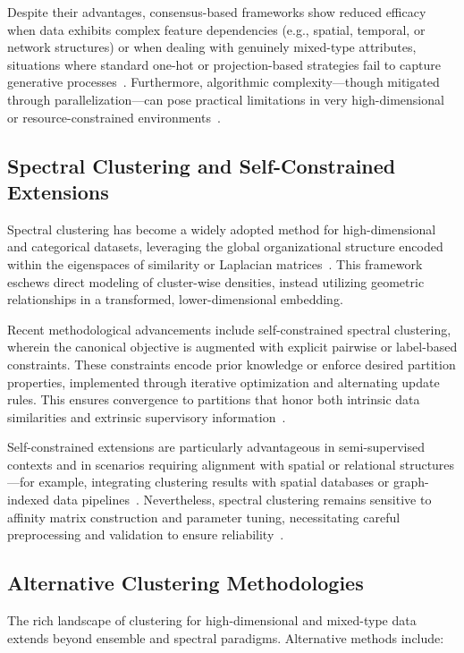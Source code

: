 Despite their advantages, consensus-based frameworks show reduced efficacy when data exhibits complex feature dependencies (e.g., spatial, temporal, or network structures) or when dealing with genuinely mixed-type attributes, situations where standard one-hot or projection-based strategies fail to capture generative processes~\cite{ref116}. Furthermore, algorithmic complexity—though mitigated through parallelization—can pose practical limitations in very high-dimensional or resource-constrained environments~\cite{ref116}.

\subsection{Spectral Clustering and Self-Constrained Extensions}

Spectral clustering has become a widely adopted method for high-dimensional and categorical datasets, leveraging the global organizational structure encoded within the eigenspaces of similarity or Laplacian matrices~\cite{ref36,ref117}. This framework eschews direct modeling of cluster-wise densities, instead utilizing geometric relationships in a transformed, lower-dimensional embedding.

Recent methodological advancements include self-constrained spectral clustering, wherein the canonical objective is augmented with explicit pairwise or label-based constraints. These constraints encode prior knowledge or enforce desired partition properties, implemented through iterative optimization and alternating update rules. This ensures convergence to partitions that honor both intrinsic data similarities and extrinsic supervisory information~\cite{ref117}.

Self-constrained extensions are particularly advantageous in semi-supervised contexts and in scenarios requiring alignment with spatial or relational structures—for example, integrating clustering results with spatial databases or graph-indexed data pipelines~\cite{ref117}. Nevertheless, spectral clustering remains sensitive to affinity matrix construction and parameter tuning, necessitating careful preprocessing and validation to ensure reliability~\cite{ref36,ref117}.

\subsection{Alternative Clustering Methodologies}

The rich landscape of clustering for high-dimensional and mixed-type data extends beyond ensemble and spectral paradigms. Alternative methods include:

